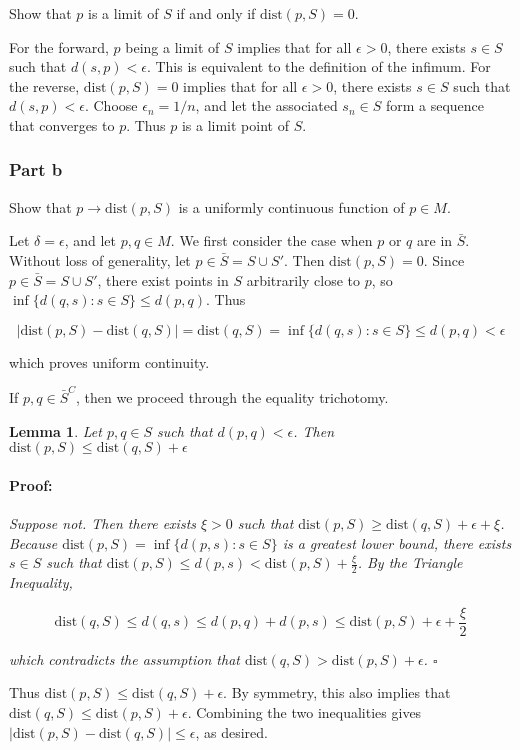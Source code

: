 \documentclass{article}
\newenvironment{proof}{\paragraph{Proof:}}{\hfill$\square$}
\newtheorem{lemma}[theorem]{Lemma}
\newcommand{\dist}{\text{dist}}
\begin{document}
Show that $p$ is a limit of $S$ if and only if $\dist(p, S) = 0$.

For the forward, $p$ being a limit of $S$ implies that for all $\epsilon > 0$, there exists $s \in S$ such that $d(s, p) < \epsilon$. This is equivalent to the definition of the infimum. For the reverse, $\dist(p, S) = 0$ implies that for all $\epsilon > 0$, there exists $s \in S$ such that $d(s, p) < \epsilon$. Choose $\epsilon_n = 1/n$, and let the associated $s_n \in S$ form a sequence that converges to $p$. Thus $p$ is a limit point of $S$.

\subsubsection*{Part b}

Show that $p \rightarrow \dist(p, S)$ is a uniformly continuous function of $p \in M$.

Let $\delta = \epsilon$, and let $p, q \in M$. We first consider the case when $p$ or $q$ are in $\bar{S}$. Without loss of generality, let $p \in \bar{S} = S \cup S'$. Then $\dist(p, S) = 0$. Since $p \in \bar{S} = S \cup S'$, there exist points in $S$ arbitrarily close to $p$, so $\inf\{d(q, s): s \in S\} \leq d(p, q)$. Thus

\[
|\dist(p, S) - \dist(q, S)| = \dist(q, S) = \inf\{d(q, s): s \in S\} \leq d(p, q) < \epsilon
\]

which proves uniform continuity.

If $p, q \in \bar{S}^C$, then we proceed through the equality trichotomy.

\begin{lemma}
Let $p, q \in S$ such that $d(p, q) < \epsilon$. Then $\dist(p, S) \leq \dist(q, S) + \epsilon$
\begin{proof}
Suppose not. Then there exists $\xi > 0$ such that $\dist(p, S) \geq \dist(q, S) + \epsilon + \xi$. Because $\dist(p, S) = \inf\{d(p, s): s \in S\}$ is a greatest lower bound, there exists $s \in S$ such that $\dist(p, S) \leq d(p, s) < \dist(p, S) + \frac{\xi}{2}$. By the Triangle Inequality,

\[
\dist(q, S) \leq d(q, s) \leq d(p, q) + d(p, s) \leq \dist(p, S) + \epsilon + \frac{\xi}{2}
\]

which contradicts the assumption that $\dist(q, S) > \dist(p, S) + \epsilon$.
\end{proof}
\end{lemma}

Thus $\dist(p, S) \leq \dist(q, S) + \epsilon$. By symmetry, this also implies that $\dist(q, S) \leq \dist(p, S) + \epsilon$. Combining the two inequalities gives $|\dist(p, S) - \dist(q, S)| \leq \epsilon$, as desired.
\end{document}
